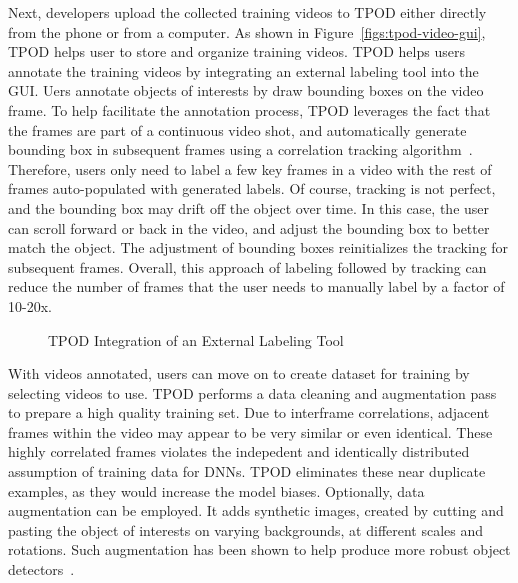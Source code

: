 Next, developers upload the collected training videos to TPOD either directly
from the phone or from a computer. As shown in Figure~\ref{figs:tpod-video-gui},
TPOD helps user to store and organize training videos. TPOD helps users annotate
the training videos by integrating an external labeling tool into the GUI. Uers
annotate objects of interests by draw bounding boxes on the video frame. To help
facilitate the annotation process, TPOD leverages the fact that the frames are
part of a continuous video shot, and automatically generate bounding box in
subsequent frames using a correlation tracking
algorithm~\cite{danelljan2014accurate}. Therefore, users only need to label a
few key frames in a video with the rest of frames auto-populated with generated
labels. Of course, tracking is not perfect, and the bounding box may drift off
the object over time. In this case, the user can scroll forward or back in the
video, and adjust the bounding box to better match the object.  The adjustment
of bounding boxes reinitializes the tracking for subsequent frames. Overall,
this approach of labeling followed by tracking can reduce the number of frames
that the user needs to manually label by a factor of 10-20x.

\begin{figure}[]
  \centering
    \caption{TPOD Integration of an External Labeling Tool}
  \label{figs:tpod-label-gui}
\end{figure}

With videos annotated, users can move on to create dataset for training by
selecting videos to use. TPOD performs a data cleaning and augmentation pass to
prepare a high quality training set. Due to interframe correlations, adjacent
frames within the video may appear to be very similar or even identical. These
highly correlated frames violates the indepedent and identically distributed
assumption of training data for DNNs. TPOD eliminates these near duplicate
examples, as they would increase the model biases.  Optionally, data
augmentation can be employed. It adds synthetic images, created by cutting and
pasting the object of interests on varying backgrounds, at different scales and
rotations. Such augmentation has been shown to help produce more robust object
detectors~\cite{dwibedi2017cut}.

